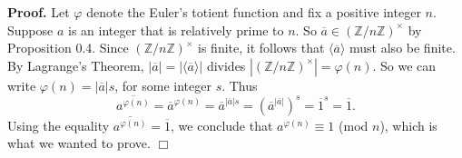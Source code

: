 \documentclass[9pt]{article}
\newcommand{\qed}{\hfill \ensuremath{\Box}}
\newcommand{\cyc}[1]{\langle #1 \rangle}
\newcommand{\Z}{\mathbb{Z}}
\begin{document}
\begin{enumerate}
      \textbf{Proof.} Let $\varphi$ denote the Euler's totient function and fix
      a positive integer $n$. Suppose $a$ is an integer that is relatively prime
      to $n$. So $\overline{a} \in (\Z/n\Z)^\times$ by Proposition 0.4. Since
      $(\Z/n\Z)^\times$ is finite, it follows that $\cyc{\overline{a}}$ must
      also be finite. By Lagrange's Theorem,
      $|\overline{a}| = |\cyc{\overline{a}}|$ divides
      $|(\Z/n\Z)^\times| = \varphi(n)$. So we can write
      $\varphi(n) = |\overline{a}|s$, for some integer $s$. Thus
      $$\overline{a^{\varphi(n)}} = \overline{a}^{\varphi(n)} =
        \overline{a}^{|\overline{a}|s} = (\overline{a}^{|\overline{a}|})^s =
        \overline{1}^s = \overline{1}.$$
      Using the equality $\overline{a^{\varphi(n)}} = \overline{1}$,
      we conclude that $a^{\varphi(n)} \equiv 1$ (mod $n$), which is what we
      wanted to prove. \qed
\end{enumerate}
\end{document}
